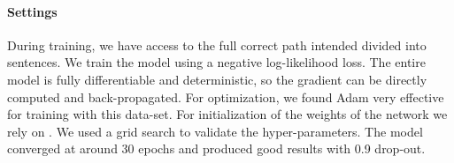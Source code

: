 \documentclass[11pt,a4paper]{article}
\begin{document}
\begin{table}[t]
\centering
{}
\caption{Empirical Results: Accuracy per Model}
\label{tab:results}
\end{table}


\paragraph{Settings}


 During training, we have access to the full correct path intended divided into sentences. We train the model using a negative log-likelihood loss. The entire model   is fully differentiable and deterministic, so the gradient can be directly computed and back-propagated.
For optimization, we found Adam \citep{kingma2014adam}
 very effective for training with this data-set. For initialization of the weights of the network we rely on  \citet{glorot2010understanding}. 
We used a grid search to validate the hyper-parameters. The model converged at around 30 epochs and produced good results with 0.9 drop-out.

\end{document}
